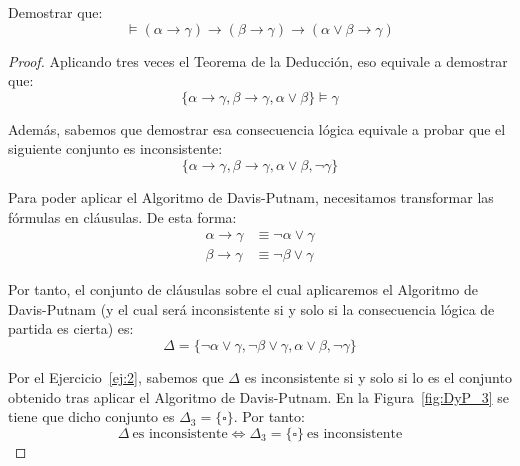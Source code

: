 \documentclass[12pt]{article}
\begin{document}
    \begin{ejercicio}\label{ej:3}
        Demostrar que:
        \begin{equation*}
            \vDash \left(\alpha \rightarrow \gamma\right) \rightarrow \left(\beta \rightarrow \gamma\right) \rightarrow \left(\alpha \vee \beta \rightarrow \gamma\right)
        \end{equation*}
        \begin{proof}
            Aplicando tres veces el Teorema de la Deducción, eso equivale a demostrar que:
            \begin{equation*}
                \{\alpha \rightarrow \gamma, \beta \rightarrow \gamma, \alpha \vee \beta\} \vDash \gamma
            \end{equation*}

            Además, sabemos que demostrar esa consecuencia lógica equivale a probar que el siguiente conjunto es inconsistente:
            \begin{equation*}
                \{\alpha \rightarrow \gamma, \beta \rightarrow \gamma, \alpha \vee \beta, \neg \gamma\}
            \end{equation*}

            Para poder aplicar el Algoritmo de Davis-Putnam, necesitamos transformar las fórmulas en cláusulas. De esta forma:
            \begin{align*}
                \alpha \rightarrow \gamma &\equiv \neg \alpha \vee \gamma\\
                \beta \rightarrow \gamma &\equiv \neg \beta \vee \gamma
            \end{align*}

            Por tanto, el conjunto de cláusulas sobre el cual aplicaremos el Algoritmo de Davis-Putnam (y el cual será inconsistente si y solo si la consecuencia lógica de partida es cierta) es:
            \begin{equation*}
                \Delta = \{\neg \alpha \vee \gamma, \neg \beta \vee \gamma, \alpha \vee \beta, \neg \gamma\}
            \end{equation*}

            Por el Ejercicio~\ref{ej:2}, sabemos que $\Delta$ es inconsistente si y solo si lo es el conjunto obtenido tras aplicar el Algoritmo de Davis-Putnam.
            En la Figura~\ref{fig:DyP_3} se tiene que dicho conjunto es $\Delta_3=\{\square\}$. Por tanto:
            \begin{equation*}
                \Delta\ \text{es inconsistente} \iff \Delta_3=\{\square\}\ \text{es inconsistente}
            \end{equation*}


\end{proof}
\end{ejercicio}
\end{document}
